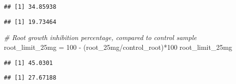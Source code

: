\documentclass[
]{article}
\newenvironment{Shaded}{\begin{snugshade}}{\end{snugshade}}
\newcommand{\CommentTok}[1]{\textcolor[rgb]{0.56,0.35,0.01}{\textit{#1}}}
\newcommand{\DecValTok}[1]{\textcolor[rgb]{0.00,0.00,0.81}{#1}}
\newcommand{\FunctionTok}[1]{\textcolor[rgb]{0.00,0.00,0.00}{#1}}
\newcommand{\NormalTok}[1]{#1}
\newcommand{\OtherTok}[1]{\textcolor[rgb]{0.56,0.35,0.01}{#1}}
\newcommand{\SpecialCharTok}[1]{\textcolor[rgb]{0.00,0.00,0.00}{#1}}
\begin{document}
\begin{Shaded}
\end{Shaded}

\begin{verbatim}
## [1] 34.85938
\end{verbatim}

\begin{Shaded}
\end{Shaded}

\begin{verbatim}
## [1] 19.73464
\end{verbatim}

\begin{Shaded}
\begin{Highlighting}[]
\CommentTok{\# Root growth inhibition percentage, compared to control sample}
\NormalTok{root\_limit\_25mg }\OtherTok{=} \DecValTok{100} \SpecialCharTok{{-}}\NormalTok{ (root\_25mg}\SpecialCharTok{/}\NormalTok{control\_root)}\SpecialCharTok{*}\DecValTok{100}
\NormalTok{root\_limit\_25mg}
\end{Highlighting}
\end{Shaded}

\begin{verbatim}
## [1] 45.0301
\end{verbatim}

\begin{Shaded}
\end{Shaded}

\begin{verbatim}
## [1] 27.67188
\end{verbatim}

\begin{Shaded}
\end{Shaded}
\end{document}
